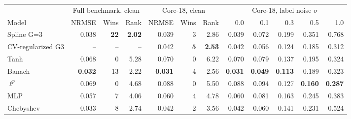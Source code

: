 \begin{tabular}{lrrrrrrrrrrr}
\toprule
& \multicolumn{3}{c}{Full benchmark, clean} & \multicolumn{3}{c}{Core-18, clean} & \multicolumn{5}{c}{Core-18, label noise $\sigma$} \\
\cmidrule(lr){2-4}\cmidrule(lr){5-7}\cmidrule(lr){8-12}
Model & NRMSE & Wins & Rank & NRMSE & Wins & Rank & 0.0 & 0.1 & 0.3 & 0.5 & 1.0 \\
\midrule
Spline G=3 & 0.038 & \textbf{22} & \textbf{2.02} & 0.039 & 3 & 2.86 & 0.039 & 0.072 & 0.199 & 0.351 & 0.768 \\
CV-regularized G3 & -- & -- & -- & 0.042 & \textbf{5} & \textbf{2.53} & 0.042 & 0.056 & 0.124 & 0.185 & 0.312 \\
Tanh & 0.068 & 0 & 5.28 & 0.070 & 0 & 6.22 & 0.070 & 0.079 & 0.137 & 0.195 & 0.324 \\
Banach & \textbf{0.032} & 13 & 2.22 & \textbf{0.031} & 4 & 2.56 & \textbf{0.031} & \textbf{0.049} & \textbf{0.113} & 0.189 & 0.323 \\
$\ell^p$ & 0.069 & 0 & 4.68 & 0.088 & 0 & 5.50 & 0.088 & 0.094 & 0.127 & \textbf{0.160} & \textbf{0.287} \\
MLP & 0.057 & 7 & 4.06 & 0.060 & 4 & 4.78 & 0.060 & 0.081 & 0.163 & 0.245 & 0.383 \\
Chebyshev & 0.033 & 8 & 2.74 & 0.042 & 2 & 3.56 & 0.042 & 0.060 & 0.141 & 0.231 & 0.524 \\
\bottomrule
\end{tabular}
